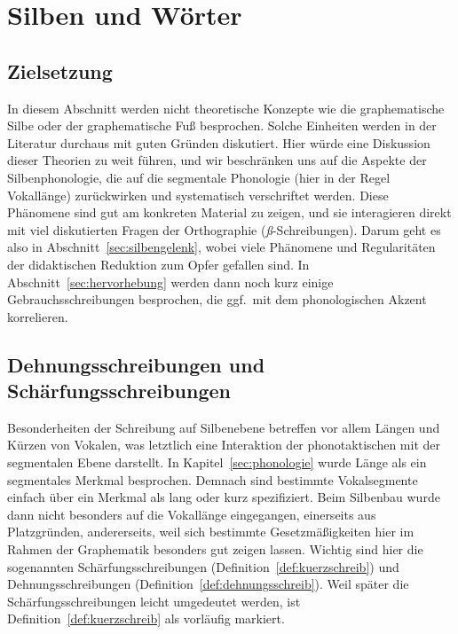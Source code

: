 \section{Silben und Wörter}

\label{sec:silbenschreib}

\subsection{Zielsetzung}

In diesem Abschnitt werden nicht theoretische Konzepte wie die graphematische Silbe oder der graphematische Fuß besprochen.
Solche Einheiten werden in der Literatur durchaus mit guten Gründen diskutiert.
Hier würde eine Diskussion dieser Theorien zu weit führen, und wir beschränken uns auf die Aspekte der Silbenphonologie, die auf die segmentale Phonologie (hier in der Regel Vokallänge) zurückwirken und systematisch verschriftet werden.
Diese Phänomene sind gut am konkreten Material zu zeigen, und sie interagieren direkt mit viel diskutierten Fragen der Orthographie (\zB \textit{ß}-Schreibungen).
Darum geht es also in Abschnitt~\ref{sec:silbengelenk}, wobei viele Phänomene und Regularitäten der didaktischen Reduktion zum Opfer gefallen sind.
In Abschnitt~\ref{sec:hervorhebung} werden dann noch kurz einige Gebrauchsschreibungen besprochen, die ggf.\ mit dem phonologischen Akzent korrelieren.

\subsection{Dehnungsschreibungen und Schärfungsschreibungen}

\label{sec:laengeschreib}

Besonderheiten der Schreibung auf Silbenebene betreffen vor allem Längen und Kürzen von Vokalen, was letztlich eine Interaktion der phonotaktischen mit der segmentalen Ebene darstellt.
In Kapitel~\ref{sec:phonologie} wurde Länge als ein segmentales Merkmal besprochen.
Demnach sind bestimmte Vokalsegmente einfach über ein Merkmal als lang oder kurz spezifiziert.
Beim Silbenbau wurde dann nicht besonders auf die Vokallänge eingegangen, einerseits aus Platzgründen, andererseits, weil sich bestimmte Gesetzmäßigkeiten hier im Rahmen der Graphematik besonders gut zeigen lassen.
Wichtig sind hier die sogenannten Schärfungsschreibungen (Definition~\ref{def:kuerzschreib}) und Dehnungsschreibungen (Definition~\ref{def:dehnungsschreib}).
Weil später die Schärfungsschreibungen leicht umgedeutet werden, ist Definition~\ref{def:kuerzschreib} als vorläufig markiert.

